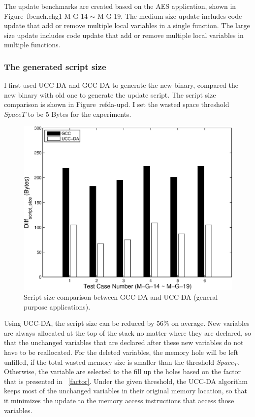 The update benchmarks are created based on the AES application, 
shown in Figure~{fbench.chg1} M-G-14 $\sim$ M-G-19.
The medium size update includes code update that add or remove multiple
local variables in a single function. The large size update includes code update
that add or remove multiple local variables in multiple functions.


\subsubsection{The generated script size}

I first used UCC-DA and GCC-DA to generate the new binary, compared the
new binary with old one to generate the update script.
The script size comparison is shown in Figure~ref{da-upd}.
I set the wasted space threshold $SpaceT$ to be 5 Bytes for the experiments.

\begin{figure}[htbp]
\centering
\includegraphics[scale=0.6]{./figures/da-upd.eps}
\caption{Script size comparison between GCC-DA and UCC-DA (general purpose applications).}
\label{da-upd}
\vspace{-0.1in}
\end{figure}

Using UCC-DA, the script size can be reduced by 56\% on average.
New variables are always allocated at the top of the stack no matter where they are
declared, so that the unchanged variables that are declared after these new variables
do not have to be reallocated.
For the deleted variables, the memory hole will be left unfilled, if the total wasted memory size
 is smaller than the threshold $Space_T$. Otherwise, the variable are selected
 to the fill up the holes based on the factor that is presented in ~\ref{factor}.
 Under the given threshold, the UCC-DA algorithm keeps most of the unchanged variables
in their original memory location, so that it minimizes the update to the memory access instructions
that access those variables.

